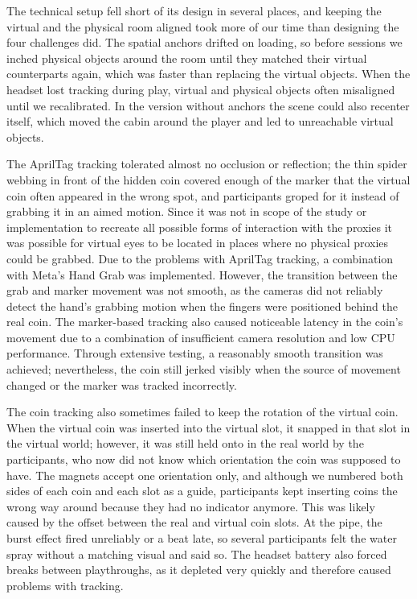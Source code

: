 The technical setup fell short of its design in several places, and keeping the virtual and the physical room aligned took more of our time than designing the four challenges did. The spatial anchors drifted on loading, so before sessions we inched physical objects around the room until they matched their virtual counterparts again, which was faster than replacing the virtual objects. When the headset lost tracking during play, virtual and physical objects often misaligned until we recalibrated. In the version without anchors the scene could also recenter itself, which moved the cabin around the player and led to unreachable virtual objects. 

The AprilTag tracking tolerated almost no occlusion or reflection; the thin spider webbing in front of the hidden coin covered enough of the marker that the virtual coin often appeared in the wrong spot, and participants groped for it instead of grabbing it in an aimed motion.
Since it was not in scope of the study or implementation to recreate all possible forms of interaction with the proxies it was possible for virtual eyes to be located in places where no physical proxies could be grabbed. Due to the problems with AprilTag tracking, a combination with Meta's Hand Grab was implemented. However, the transition between the grab and marker movement was not smooth, as the cameras did not reliably detect the hand's grabbing motion when the fingers were positioned behind the real coin. The marker-based tracking also caused noticeable latency in the coin's movement due to a combination of insufficient camera resolution and low CPU performance. Through extensive testing, a reasonably smooth transition was achieved; nevertheless, the coin still jerked visibly when the source of movement changed or the marker was tracked incorrectly.

The coin tracking also sometimes failed to keep the rotation of the virtual coin. When the virtual coin was inserted into the virtual slot, it snapped in that slot in the virtual world; however, it was still held onto in the real world by the participants, who now did not know which orientation the coin was supposed to have. The magnets accept one orientation only, and although we numbered both sides of each coin and each slot as a guide, participants kept inserting coins the wrong way around because they had no indicator anymore. This was likely caused by the offset between the real and virtual coin slots. At the pipe, the burst effect fired unreliably or a beat late, so several participants felt the water spray without a matching visual and said so. The headset battery also forced breaks between playthroughs, as it depleted very quickly and therefore caused problems with tracking.

